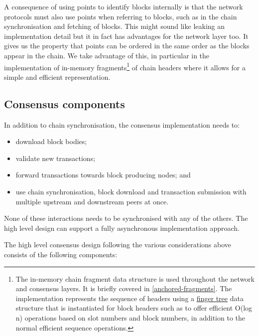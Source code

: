 \documentclass[11pt,a4paper]{article}
\begin{document}
A consequence of using points to identify blocks internally is that the
network protocols must also use points when referring to blocks, such as
in the chain synchronisation and fetching of blocks. This might sound
like leaking an implementation detail but it in fact has advantages for
the network layer too. It gives us the property that points can be
ordered in the same order as the blocks appear in the chain. We take
advantage of this, in particular in the implementation of in-memory
fragments\footnote{The in-memory chain fragment data structure is used
  throughout the network and consensus layers. It is briefly covered in
  \cref{anchored-fragments}. The
  implementation represents the sequence of headers using a
  \href{http://www.staff.city.ac.uk/~ross/papers/FingerTree.html}{{finger
  tree}} data structure that is instantiated for block headers such as
  to offer efficient O(log n) operations based on slot numbers and block
  numbers, in addition to the normal efficient sequence operations.} of
chain headers where it allows for a simple and efficient representation.

\subsection{Consensus components}
\label{consensus-components}

In addition to chain synchronisation, the consensus implementation needs
to:

\begin{itemize}
\item
  download block bodies;
\item
  validate new transactions;
\item
  forward transactions towards block producing nodes; and
\item
  use chain synchronisation, block download and transaction submission
  with multiple upstream and downstream peers at once.
\end{itemize}

None of these interactions needs to be synchronised with any of the
others. The high level design can support a fully asynchronous
implementation approach.

The high level consensus design following the various considerations
above consists of the following components:
\end{document}
